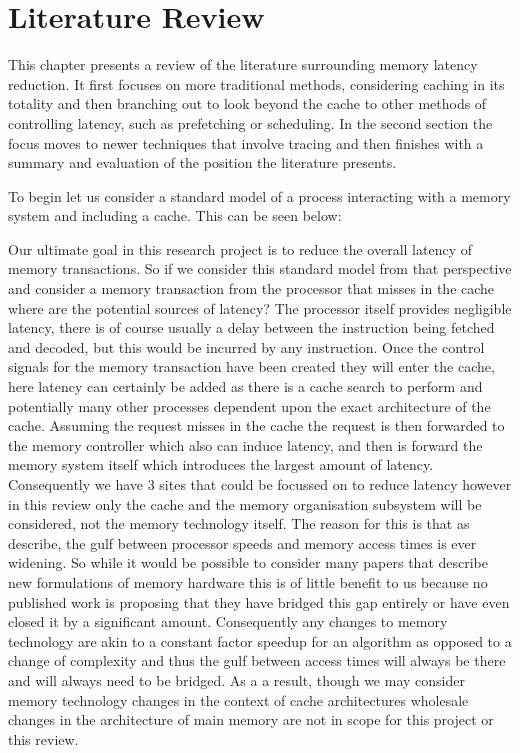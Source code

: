 
\chapter{Literature Review}

This chapter presents a review of the literature surrounding memory latency reduction. It first focuses on more traditional methods, considering caching in its totality and then branching out to look beyond the cache to other methods of controlling latency, such as prefetching or scheduling. In the second section the focus moves to newer techniques that involve tracing and then finishes with a summary and evaluation of the position the literature presents.

To begin let us consider a standard model of a process interacting with a memory system and including a cache. This can be seen below:



Our ultimate goal in this research project is to reduce the overall latency of memory transactions. So if we consider this standard model from that perspective and consider a memory transaction from the processor that misses in the cache where are the potential sources of latency? The processor itself provides negligible latency, there is of course usually a delay between the instruction being fetched and decoded, but this would be incurred by any instruction. Once the control signals for the memory transaction have been created they will enter the cache, here latency can certainly be added as there is a cache search to perform and potentially many other processes dependent upon the exact architecture of the cache. Assuming the request misses in the cache the request is then forwarded to the memory controller which also can induce latency, and then is forward the memory system itself which introduces the largest amount of latency. Consequently we have 3 sites that could be focussed on to reduce latency however in this review only the cache and the memory organisation subsystem will be considered, not the memory technology itself. The reason for this is that as \citet{pattersonComputerOrganizationDesign2018} describe, the gulf between processor speeds and memory access times is ever widening. So while it would be possible to consider many papers that describe new formulations of memory hardware this is of little benefit to us because no published work is proposing that they have bridged this gap entirely or have even closed it by a significant amount. Consequently any changes to memory technology are akin to a constant factor speedup for an algorithm as opposed to a change of complexity and thus the gulf between access times will always be there and will always need to be bridged. As a a result, though we may consider memory technology changes in the context of cache architectures wholesale changes in the architecture of main memory are not in scope for this project or this review.

